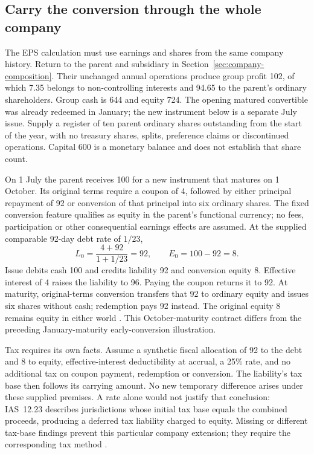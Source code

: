 \subsection{Carry the conversion through the whole company}
\label{sec:company-eps-join}

The EPS calculation must use earnings and shares from the same company
history. Return to the parent and subsidiary in
Section~\ref{sec:company-composition}. Their unchanged annual operations
produce group profit 102, of which 7.35 belongs to non-controlling interests
and 94.65 to the parent's ordinary shareholders. Group cash is 644 and equity
724. The opening matured convertible was already redeemed in January;
the new instrument below is a separate July issue. Supply a register of ten
parent ordinary shares outstanding from the start of the year, with no
treasury shares, splits, preference claims or discontinued operations.
Capital 600 is a monetary balance and does not establish that share count.

On 1 July the parent receives 100 for a new instrument that matures on
1 October. Its original terms require a coupon of 4, followed by either
principal repayment of 92 or conversion of that principal into six ordinary
shares. The fixed conversion feature qualifies as equity in the parent's
functional currency; no fees, participation or other consequential earnings
effects are assumed. At the supplied comparable 92-day debt rate of $1/23$,
\[
 L_0=\frac{4+92}{1+1/23}=92,\qquad E_0=100-92=8.
\]
Issue debits cash 100 and credits liability 92 and conversion equity 8.
Effective interest of 4 raises the liability to 96. Paying the coupon returns
it to 92. At maturity, original-terms conversion transfers that 92 to ordinary
equity and issues six shares without cash; redemption pays 92 instead.
The original equity 8 remains equity in either world
\citep[IAS~32, paragraphs 28--32 and AG32]{eu20231803}.
This October-maturity contract differs from the preceding January-maturity
early-conversion illustration.

Tax requires its own facts. Assume a synthetic fiscal allocation of 92 to
the debt and 8 to equity, effective-interest deductibility at accrual, a 25\%
rate, and no additional tax on coupon payment, redemption or conversion.
The liability's tax base then follows its carrying amount. No new temporary
difference arises under these supplied premises. A rate alone would not
justify that conclusion: IAS~12.23 describes jurisdictions whose initial tax
base equals the combined proceeds, producing a deferred tax liability charged
to equity. Missing or different tax-base findings prevent this particular
company extension; they require the corresponding tax method
\citep[IAS~12, paragraphs 8, 23, 58 and 61A]{eu20231803}.

